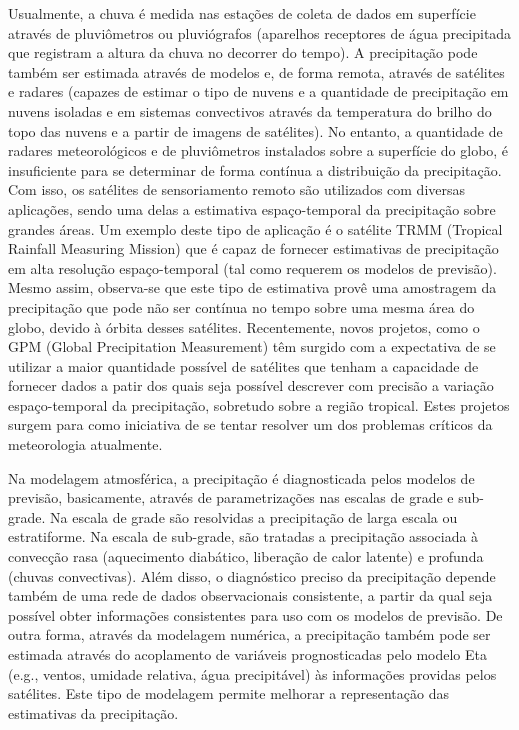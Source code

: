 Usualmente, a chuva é medida nas estações de coleta de dados em superfície através de pluviômetros ou pluviógrafos (aparelhos receptores de água precipitada que registram a altura da chuva no decorrer do tempo). A precipitação pode também ser estimada através de modelos e, de forma remota, através de satélites e radares (capazes de estimar o tipo de nuvens e a quantidade de precipitação em nuvens isoladas e em sistemas convectivos através da temperatura do brilho do topo das nuvens e a partir de imagens de satélites). No entanto, a quantidade de radares meteorológicos e de pluviômetros instalados sobre a superfície do globo, é insuficiente para se determinar de forma contínua a distribuição da precipitação. Com isso, os satélites de sensoriamento remoto são utilizados com diversas aplicações, sendo uma delas a estimativa espaço-temporal da precipitação sobre grandes áreas. Um exemplo deste tipo de aplicação é o satélite TRMM (Tropical Rainfall Measuring Mission) que é capaz de fornecer estimativas de precipitação em alta resolução espaço-temporal (tal como requerem os modelos de previsão). Mesmo assim, observa-se que este tipo de estimativa provê uma amostragem da precipitação que pode não ser contínua no tempo sobre uma mesma área do globo, devido à órbita desses satélites. Recentemente, novos projetos, como o GPM (Global Precipitation Measurement) têm surgido com a expectativa de se utilizar a maior quantidade possível de satélites que tenham a capacidade de fornecer dados a patir dos quais seja possível descrever com precisão a variação espaço-temporal da precipitação, sobretudo sobre a região tropical. Estes projetos surgem para como iniciativa de se tentar resolver um dos problemas críticos da meteorologia atualmente.

Na modelagem atmosférica, a precipitação é diagnosticada pelos modelos de previsão, basicamente, através de parametrizações nas escalas de grade e sub-grade. Na escala de grade são resolvidas a precipitação de larga escala ou estratiforme. Na escala de sub-grade, são tratadas a precipitação associada à convecção rasa (aquecimento diabático, liberação de calor latente) e profunda (chuvas convectivas). Além disso, o diagnóstico preciso da precipitação depende também de uma rede de dados observacionais consistente, a partir da qual seja possível obter informações consistentes para uso com os modelos de previsão. De outra forma, através da modelagem numérica, a precipitação também pode ser estimada através do acoplamento de variáveis prognosticadas pelo modelo Eta (e.g., ventos, umidade relativa, água precipitável) às informações providas pelos satélites. Este tipo de modelagem permite melhorar a representação das estimativas da precipitação.


